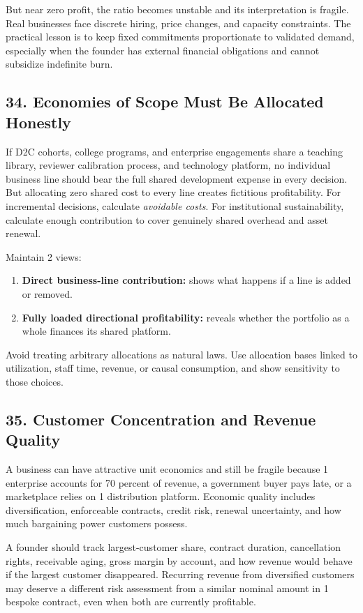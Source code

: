 But near zero profit, the ratio becomes unstable and its interpretation is fragile. Real businesses face discrete hiring, price changes, and capacity constraints. The practical lesson is to keep fixed commitments proportionate to validated demand, especially when the founder has external financial obligations and cannot subsidize indefinite burn.

\subsection*{34. Economies of Scope Must Be Allocated Honestly}

If D2C cohorts, college programs, and enterprise engagements share a teaching library, reviewer calibration process, and technology platform, no individual business line should bear the full shared development expense in every decision. But allocating zero shared cost to every line creates fictitious profitability. For incremental decisions, calculate \emph{avoidable costs}. For institutional sustainability, calculate enough contribution to cover genuinely shared overhead and asset renewal.

Maintain 2 views:
\begin{enumerate}
  \item \textbf{Direct business-line contribution:} shows what happens if a line is added or removed.
  \item \textbf{Fully loaded directional profitability:} reveals whether the portfolio as a whole finances its shared platform.
\end{enumerate}
Avoid treating arbitrary allocations as natural laws. Use allocation bases linked to utilization, staff time, revenue, or causal consumption, and show sensitivity to those choices.

\subsection*{35. Customer Concentration and Revenue Quality}

A business can have attractive unit economics and still be fragile because 1 enterprise accounts for 70 percent of revenue, a government buyer pays late, or a marketplace relies on 1 distribution platform. Economic quality includes diversification, enforceable contracts, credit risk, renewal uncertainty, and how much bargaining power customers possess.

A founder should track largest-customer share, contract duration, cancellation rights, receivable aging, gross margin by account, and how revenue would behave if the largest customer disappeared. Recurring revenue from diversified customers may deserve a different risk assessment from a similar nominal amount in 1 bespoke contract, even when both are currently profitable.

